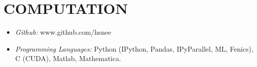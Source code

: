 \section{COMPUTATION} 

\begin{itemize} \item {\sl Github:} www.github.com/hsnee \\
\item {\sl Programming Languages:} Python (IPython, Pandas, IPyParallel, ML, Fenics), C (CUDA), Matlab, Mathematica. \\
\end{itemize}
